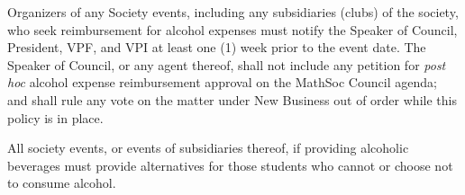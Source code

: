 Organizers of any Society events, including any subsidiaries (clubs) of the society,  who seek reimbursement for alcohol expenses must notify the Speaker of Council, President, VPF, and VPI at least one (1) week prior to the event date. The Speaker of Council, or any agent thereof, shall not include any petition for \textit{post hoc} alcohol expense reimbursement approval on the MathSoc Council agenda; and shall rule any vote on the matter under New Business out of order while this policy is in place. 

All society events, or events of subsidiaries thereof, if providing alcoholic beverages must provide alternatives for those students who cannot or choose not to consume alcohol.